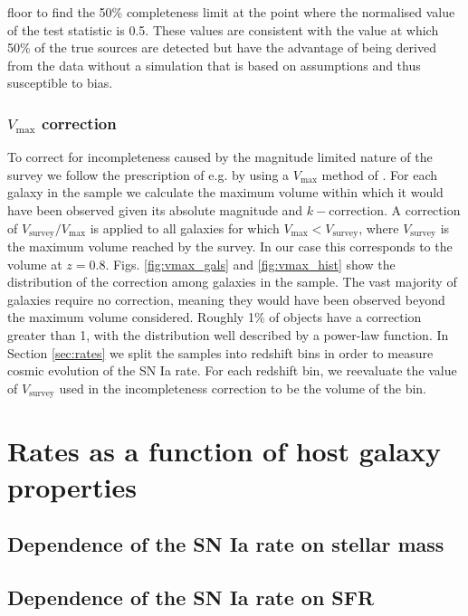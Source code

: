\documentclass[fleqn,usenatbib]{mnras}
\begin{document}
floor to find the 50\% completeness limit at the point where the normalised value of the test statistic is 0.5. These values are consistent with the value at which 50\% of the true sources are detected but have the advantage of being derived from the data without a simulation that is based on assumptions and thus susceptible to bias.

\subsubsection{$V_{\mathrm{max}}$ correction \label{subsubsec:vmax_corr}}

To correct for incompleteness caused by the magnitude limited nature of the survey we follow the prescription of e.g. \citet{Sullivan2006, Smith2012} by using a $V_{\mathrm{max}}$ method of \citet{Schmid1968}. For each galaxy in the sample we calculate the maximum volume within which it would have been observed given its absolute magnitude and $k-$correction. A correction of $V_{\mathrm{survey}}/V_{\mathrm{max}}$ is applied to all galaxies for which $V_{\mathrm{max}} < V_{\mathrm{survey}}$, where $V_{\mathrm{survey}}$ is the maximum volume reached by the survey. In our case this corresponds to the volume at $z=0.8$. Figs. \ref{fig:vmax_gals} and \ref{fig:vmax_hist} show the distribution of the correction among galaxies in the sample. The vast majority of galaxies require no correction, meaning they would have been observed beyond the maximum volume considered. Roughly 1\% of objects have a correction greater than 1, with the distribution well described by a power-law function. In Section \ref{sec:rates} we split the samples into redshift bins in order to measure cosmic evolution of the SN Ia rate. For each redshift bin, we reevaluate the value of $V_{\mathrm{survey}}$ used in the incompleteness correction to be the volume of the bin.

\section{Rates as a function of host galaxy properties \label{sec:rates}}

\subsection{Dependence of the SN Ia rate on stellar mass \label{subsec:rates_mass}}

\subsection{Dependence of the SN Ia rate on SFR \label{subsec:rates_sfr}}
\end{document}

